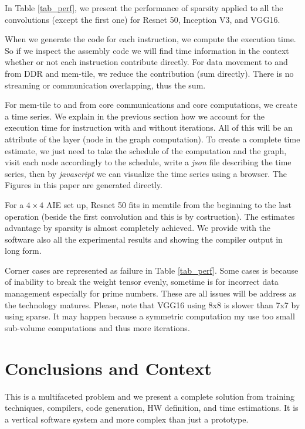 \documentclass[sigconf]{acmart}
\begin{document}
In Table \ref{tab_perf}, we present the performance of sparsity
applied to all the convolutions (except the first one) for Resnet 50,
Inception V3, and VGG16.


When we generate the code for each instruction, we compute the
execution time. So if we inspect the assembly code we will find time
information in the context whether or not each instruction contribute
directly. For data movement to and from DDR and mem-tile, we reduce
the contribution (sum directly). There is no streaming or
communication overlapping, thus the sum.

For mem-tile to and from core communications and core computations, we
create a time series. We explain in the previous section how we
account for the execution time for instruction with and without
iterations. All of this will be an attribute of the layer (node in the
graph computation).  To create a complete time estimate, we just need
to take the schedule of the computation and the graph, visit each node
accordingly to the schedule, write a {\em json} file describing the
time series, then by {\em javascript} we can visualize the time series
using a browser. The Figures in this paper are generated directly.

For a $4\times 4$ AIE set up, Resnet 50 fits in memtile from the
beginning to the last operation (beside the first convolution and this
is by costruction). The estimates advantage by sparsity is almost
completely achieved. We provide with the software also all the
experimental results %
and showing the compiler output in long form.

Corner cases are represented as failure in Table \ref{tab_perf}. Some
cases is because of inability to break the weight tensor evenly,
sometime is for incorrect data management especially for prime
numbers. These are all issues will be address as the technology
matures. Please, note that VGG16 using 8x8 is slower than 7x7 by using
sparse.  It may happen because a symmetric computation my use too
small sub-volume computations and thus more iterations.

\section{Conclusions and Context}
This is a multifaceted problem and we present a complete solution from
training techniques, compilers, code generation, HW definition, and
time estimations. It is a vertical software system and more complex
than just a prototype.
\end{document}
